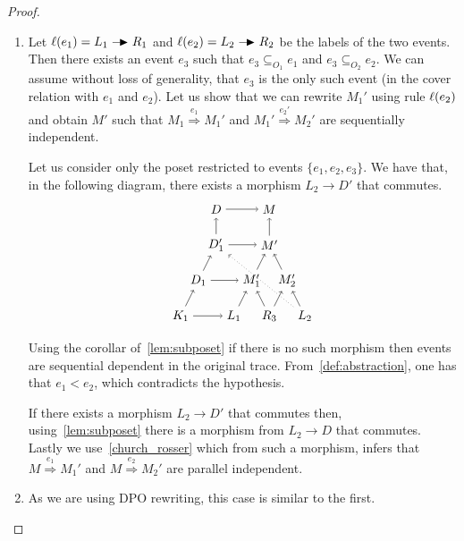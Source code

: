 \begin{proof}
  \begin{enumerate}
  \item Let $\labl(e_1)=L_1\action R_1$ and $\labl(e_2)=L_2\action R_2$ be the labels of the two events.
    Then there exists an event $e_3$ such that $e_3\subseteq_{O_1} e_1$ and $e_3\subseteq_{O_2} e_2$. We can assume without loss of generality, that $e_3$ is the only such event (in the cover relation with $e_1$ and $e_2$). Let us show that we can rewrite $M_1'$ using rule $\ell(e_2)$ and obtain $M'$ such that $M_1\overset{e_1}{\Rightarrow} M_1'$ and $M_1'\overset{e_2'}{\Rightarrow} M_2'$ are sequentially independent.

     Let us consider only the poset restricted to events $\{e_1,e_2,e_3\}$. We have that, in the following diagram, there exists a morphism $L_2\to D'$ that commutes.
     \[
     \begin{tikzpicture} %
       \node (k1) at (0,0) {\(K_1\)};
       \node (l1) at (1.5,0) {\(L_1\)};
       \node (r3) at (2.5,0) {\(R_3\)};
       \node (l2) at (3.5,0) {\(L_2\)};
       \node (m1) at (2,1) {\(M_1'\)};
       \node (m2) at (3,1) {\(M_2'\)};
       \node (d1) at (0.5,1) {\(D_1\)};
       \node (d1p) at (1,2) {\(D_1'\)};
       \node (m1p) at (2.5,2) {\(M'\)};
       \node (d) at (1,3) {\(D\)};
       \node (m) at (2.5,3) {\(M\)};
       \draw [->] (k1) -- (l1);
       \draw [->] (k1) -- (d1);
       \draw [->] (d1) -- (d1p);
       \draw [->] (d1) -- (m1);
       \draw [->] (d1p) -- (d);
       \draw [->] (d1p) -- (m1p);
       \draw [->] (d) -- (m);
       \draw [->] (l1) -- (m1);
       \draw [->] (r3) -- (m1);
       \draw [->] (r3) -- (m2);
       \draw [->] (l2) -- (m2);
       \draw [->] (m2) -- (m1p);
       \draw [->] (m1) -- (m1p);
       \draw [->] (m1p) -- (m);
       \draw [dotted,->] (l2) -- (d1p);
     \end{tikzpicture}
     \]

     Using the corollar of~\autoref{lem:subposet} if there is no such morphism then events are sequential dependent in the original trace. From~\autoref{def:abstraction}, one has that $e_1 < e_2$, which contradicts the hypothesis.

     If there exists a morphism $L_2\to D'$ that commutes then, using~\autoref{lem:subposet} there is a morphism from $L_2\to D$ that commutes.
     Lastly we use~\autoref{church_rosser} which from such a morphism, infers that $M\overset{e_1}{\Rightarrow} M_1'$ and $M\overset{e_2}{\Rightarrow} M_2'$ are parallel independent.

  \item As we are using DPO rewriting, this case is similar to the first.
  \end{enumerate}
\end{proof}


